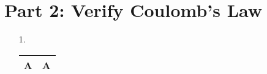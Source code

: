 ﻿\documentclass[12pt, letterpaper]{article}
\begin{document}
    \section*{Part 2: Verify Coulomb's Law}

    \begin{enumerate}
        \item [1.]\mbox{}
        \begin{mdframed}
            \begin{center}
                \begin{tabular}{|c|c|}
                    \hline
                    A & A   \\
                    \hline
                \end{tabular}
            \end{center}
        \end{mdframed}
    \end{enumerate}
\end{document}
